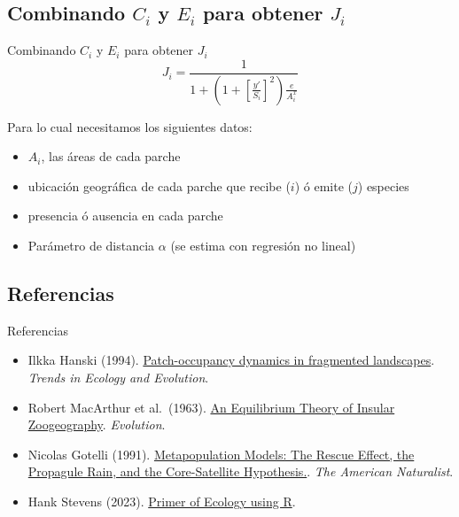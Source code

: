 \documentclass[
  11pt,
  ignorenonframetext,
]{beamer}
\begin{document}
\hypertarget{combinando-c_i-y-e_i-para-obtener-j_i}{%
\subsection{\texorpdfstring{Combinando \(C_i\) y \(E_i\) para obtener
\(J_i\)}{Combinando C\_i y E\_i para obtener J\_i}}\label{combinando-c_i-y-e_i-para-obtener-j_i}}

\begin{frame}{Combinando \(C_i\) y \(E_i\) para obtener \(J_i\)}
\begin{equation}
J_i = \frac{1}{1 + \left( 1 + \left[ \frac{y'}{S_i} \right]^2 \right) \frac{e}{A_i^x}}
\end{equation}

Para lo cual necesitamos los siguientes datos:

\begin{itemize}
\item
  \(A_i\), las áreas de cada parche
\item
  ubicación geográfica de cada parche que recibe (\(i\)) ó emite (\(j\))
  especies
\item
  presencia ó ausencia en cada parche
\item
  Parámetro de distancia \(\alpha\) (se estima con regresión no lineal)
\end{itemize}
\end{frame}

\hypertarget{referencias}{%
\subsection{Referencias}\label{referencias}}

\begin{frame}{Referencias}
\begin{itemize}
\item
  Ilkka Hanski (1994).
  \href{https://doi.org/10.1016/0169-5347(94)90177-5}{Patch-occupancy
  dynamics in fragmented landscapes}. \emph{Trends in Ecology and
  Evolution}.
\item
  Robert MacArthur et al.~(1963).
  \href{https://doi.org/10.2307/2407089}{An Equilibrium Theory of
  Insular Zoogeography}. \emph{Evolution}.
\item
  Nicolas Gotelli (1991).
  \href{https://www.journals.uchicago.edu/doi/10.1086/285249}{Metapopulation
  Models: The Rescue Effect, the Propagule Rain, and the Core-Satellite
  Hypothesis.}. \emph{The American Naturalist}.
\item
  Hank Stevens (2023).
  \href{https://hankstevens.github.io/Primer-of-Ecology/index.html}{Primer
  of Ecology using R}.
\end{itemize}
\end{frame}
\end{document}

